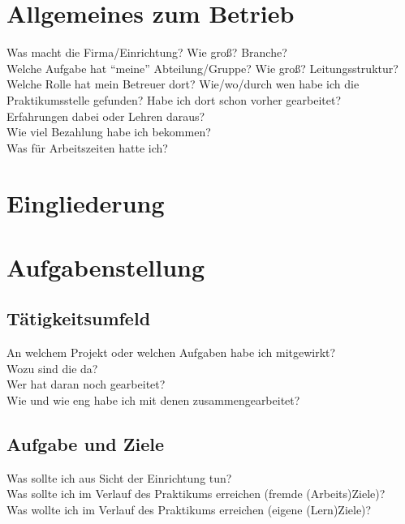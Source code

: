 \documentclass[pdftex,12pt,a4paper]{scrreprt}
\begin{document}

\tableofcontents

\begin{abstract}

\end{abstract}

\section{Allgemeines zum Betrieb}

Was macht die Firma/Einrichtung? Wie groß? Branche?\\
Welche Aufgabe hat "`meine"' Abteilung/Gruppe? Wie groß? Leitungsstruktur?\\
Welche Rolle hat mein Betreuer dort?
Wie/wo/durch wen habe ich die Praktikumsstelle gefunden? Habe ich dort schon vorher gearbeitet?\\
Erfahrungen dabei oder Lehren daraus?\\
Wie viel Bezahlung habe ich bekommen?\\
Was für Arbeitszeiten hatte ich?\\
\section{Eingliederung}
\section{Aufgabenstellung}
\subsection{Tätigkeitsumfeld}
An welchem Projekt oder welchen Aufgaben habe ich mitgewirkt?\\
Wozu sind die da?\\
Wer hat daran noch gearbeitet?\\
Wie und wie eng habe ich mit denen zusammengearbeitet?\\

\subsection{Aufgabe und Ziele}
Was sollte ich aus Sicht der Einrichtung tun?\\
Was sollte ich im Verlauf des Praktikums erreichen (fremde (Arbeits)Ziele)?\\
Was wollte ich im Verlauf des Praktikums erreichen (eigene (Lern)Ziele)?\\
\end{document}
